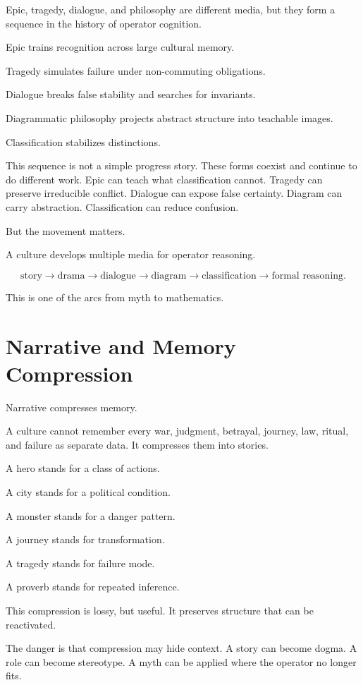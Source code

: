 \documentclass[11pt]{book}
\begin{document}
Epic, tragedy, dialogue, and philosophy are different media, but they form a sequence in the history of operator cognition.

Epic trains recognition across large cultural memory.

Tragedy simulates failure under non-commuting obligations.

Dialogue breaks false stability and searches for invariants.

Diagrammatic philosophy projects abstract structure into teachable images.

Classification stabilizes distinctions.

This sequence is not a simple progress story. These forms coexist and continue to do different work. Epic can teach what classification cannot. Tragedy can preserve irreducible conflict. Dialogue can expose false certainty. Diagram can carry abstraction. Classification can reduce confusion.

But the movement matters.

A culture develops multiple media for operator reasoning.

\[
\text{story}
\rightarrow
\text{drama}
\rightarrow
\text{dialogue}
\rightarrow
\text{diagram}
\rightarrow
\text{classification}
\rightarrow
\text{formal reasoning}.
\]

This is one of the arcs from myth to mathematics.

\section{Narrative and Memory Compression}

Narrative compresses memory.

A culture cannot remember every war, judgment, betrayal, journey, law, ritual, and failure as separate data. It compresses them into stories.

A hero stands for a class of actions.

A city stands for a political condition.

A monster stands for a danger pattern.

A journey stands for transformation.

A tragedy stands for failure mode.

A proverb stands for repeated inference.

This compression is lossy, but useful. It preserves structure that can be reactivated.

The danger is that compression may hide context. A story can become dogma. A role can become stereotype. A myth can be applied where the operator no longer fits.
\end{document}
